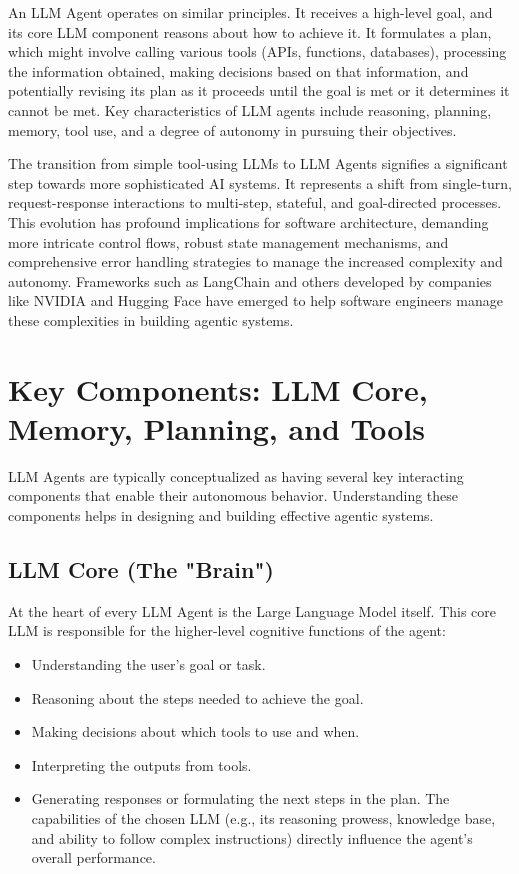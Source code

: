 An LLM Agent operates on similar principles. It receives a high-level goal, and its core LLM component reasons about how to achieve it. It formulates a plan, 
which might involve calling various tools (APIs, functions, databases), processing the information obtained, making decisions based on that information, 
and potentially revising its plan as it proceeds until the goal is met or it determines it cannot be met. Key characteristics of LLM agents include reasoning, 
planning, memory, tool use, and a degree of autonomy in pursuing their objectives.

The transition from simple tool-using LLMs to LLM Agents signifies a significant step towards more sophisticated AI systems. It represents a shift from 
single-turn, request-response interactions to multi-step, stateful, and goal-directed processes. This evolution has profound implications for software 
architecture, demanding more intricate control flows, robust state management mechanisms, and comprehensive error handling strategies to manage the 
increased complexity and autonomy. Frameworks such as LangChain and others developed by companies like NVIDIA and Hugging Face have emerged to help 
software engineers manage these complexities in building agentic systems.

\section{Key Components: LLM Core, Memory, Planning, and Tools}

LLM Agents are typically conceptualized as having several key interacting components that enable their autonomous behavior. 
Understanding these components helps in designing and building effective agentic systems.

\subsection*{LLM Core (The "Brain")}
At the heart of every LLM Agent is the Large Language Model itself. This core LLM is responsible for the higher-level cognitive functions of the agent:

\begin{itemize}
    \item Understanding the user's goal or task.
    \item Reasoning about the steps needed to achieve the goal.
    \item Making decisions about which tools to use and when.
    \item Interpreting the outputs from tools.
    \item Generating responses or formulating the next steps in the plan. The capabilities of the chosen LLM (e.g., its reasoning prowess, 
    knowledge base, and ability to follow complex instructions) directly influence the agent's overall performance.
\end{itemize}

